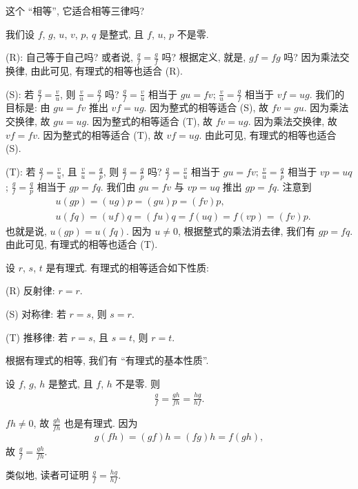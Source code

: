 这个 ``相等'', 它适合相等三律吗?

我们设 $f$, $g$, $u$, $v$, $p$, $q$ 是整式, 且 $f$, $u$, $p$ 不是零.

(R): 自己等于自己吗? 或者说, $\frac{g}{f} = \frac{g}{f}$ 吗? 根据定义, 就是, $gf = fg$ 吗? 因为乘法交换律, 由此可见, 有理式的相等也适合 (R).

(S): 若 $\frac{g}{f} = \frac{v}{u}$, 则 $\frac{v}{u} = \frac{g}{f}$ 吗? $\frac{g}{f} = \frac{v}{u}$ 相当于 $gu = fv$; $\frac{v}{u} = \frac{g}{f}$ 相当于 $vf = ug$. 我们的目标是: 由 $gu = fv$ 推出 $vf = ug$. 因为整式的相等适合 (S), 故 $fv = gu$. 因为乘法交换律, 故 $gu = ug$. 因为整式的相等适合 (T), 故 $fv = ug$. 因为乘法交换律, 故 $vf = fv$. 因为整式的相等适合 (T), 故 $vf = ug$. 由此可见, 有理式的相等也适合 (S).

(T): 若 $\frac{g}{f} = \frac{v}{u}$, 且 $\frac{v}{u} = \frac{q}{p}$, 则 $\frac{g}{f} = \frac{q}{p}$ 吗? $\frac{g}{f} = \frac{v}{u}$ 相当于 $gu = fv$; $\frac{v}{u} = \frac{q}{p}$ 相当于 $vp = uq$; $\frac{g}{f} = \frac{q}{p}$ 相当于 $gp = fq$. 我们由 $gu = fv$ 与 $vp = uq$ 推出 $gp = fq$. 注意到
\begin{align*}
     & u(gp) = (ug)p = (gu)p = (fv)p,                 \\
     & u(fq) = (uf)q = (fu)q = f(uq) = f(vp) = (fv)p.
\end{align*}
也就是说, $u(gp) = u(fq)$. 因为 $u \neq 0$, 根据整式的乘法消去律, 我们有 $gp = fq$. 由此可见, 有理式的相等也适合 (T).

\begin{proposition}
    设 $r$, $s$, $t$ 是有理式. 有理式的相等适合如下性质:

    (R) 反射律: $r = r$.

    (S) 对称律: 若 $r = s$, 则 $s = r$.

    (T) 推移律: 若 $r = s$, 且 $s = t$, 则 $r = t$.
\end{proposition}

根据有理式的相等, 我们有 ``有理式的基本性质''.
\begin{proposition}
    设 $f$, $g$, $h$ 是整式, 且 $f$, $h$ 不是零. 则
    \begin{align*}
        \frac{g}{f} = \frac{gh}{fh} = \frac{hg}{hf}.
    \end{align*}
\end{proposition}

\begin{pf}
    $fh \neq 0$, 故 $\frac{gh}{fh}$ 也是有理式. 因为
    \begin{align*}
        g(fh) = (gf)h = (fg)h = f(gh),
    \end{align*}
    故 $\frac{g}{f} = \frac{gh}{fh}$.

    类似地, 读者可证明 $\frac{g}{f} = \frac{hg}{hf}$.
\end{pf}

